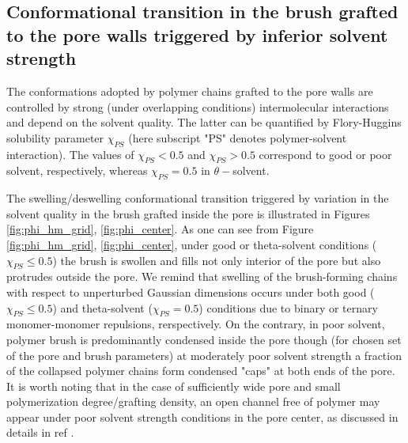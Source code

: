 \documentclass[12pt, a4paper]{article}
\begin{document}
\subsection{Conformational transition in the brush grafted to the pore walls triggered by inferior solvent strength}



The conformations adopted by polymer chains grafted to the pore walls are controlled by strong (under overlapping conditions) intermolecular interactions and depend on the solvent quality. 
The latter can be quantified by Flory-Huggins solubility parameter $\chi_{PS}$ (here subscript "PS" denotes polymer-solvent interaction). 
The values of $\chi_{PS}<0.5$ and $\chi_{PS}>0.5$ correspond to good or poor solvent, respectively, whereas $\chi_{PS}=0.5$ in $\theta-$solvent.


The swelling/deswelling conformational transition triggered by variation in the solvent quality in the brush grafted inside the pore is illustrated in 
Figures \ref{fig:phi_hm_grid}, \ref{fig:phi_center}.
As one can see from Figure \ref{fig:phi_hm_grid}, \ref{fig:phi_center},
under good or theta-solvent conditions ($\chi_{PS}\leq 0.5$) the brush is swollen and fills not only interior of the pore but also protrudes outside the pore. 
We remind that swelling of the brush-forming chains with respect to unperturbed Gaussian dimensions 
occurs  under both good ($\chi_{PS}\leq 0.5$) and theta-solvent ($\chi_{PS}= 0.5$) conditions due to binary or ternary monomer-monomer repulsions, rerspectively.
On the contrary, in poor solvent, polymer brush is predominantly condensed inside the pore though (for chosen set of the pore and brush parameters) at moderately poor solvent strength
a fraction of the collapsed polymer chains form condensed "caps" at both ends of the pore.
It is worth noting that in the case of sufficiently wide pore and small polymerization degree/grafting density, an open channel free of polymer 
may appear under poor solvent strength conditions in the pore center, as discussed in details in ref \cite{Laktionov2021}.



\end{document}
